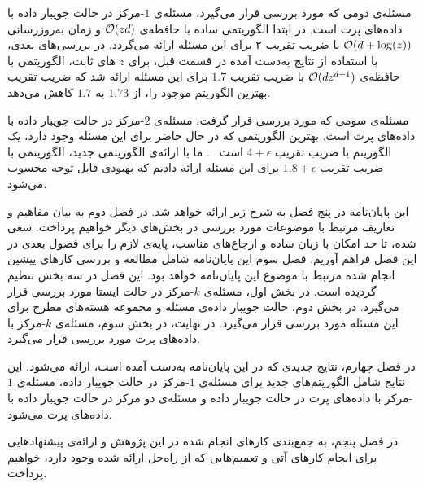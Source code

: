 مسئله‌ی دومی که مورد بررسی قرار می‌گیرد، مسئله‌ی $1$-مرکز در حالت جویبار داده با داده‌های پرت است.
در ابتدا الگوریتمی ساده با حافظه‌ی $\mathcal{O}(zd)$ و زمان به‌روزرسانی $\mathcal{O}(d + \log(z))$ با ضریب تقریب ۲ برای این مسئله ارائه می‌گردد.
در بررسی‌های بعدی، با استفاده از نتایج به‌دست آمده در قسمت قبل، برای $z$ های ثابت، الگوریتمی با حافظه‌ی $\mathcal{O}(dz^{d+1})$ با ضریب تقریب $1.7$ برای این مسئله ارائه شد که ضریب تقریب بهترین الگوریتم موجود را، از $1.73$ به $1.7$ کاهش می‌دهد.

مسئله‌ی سومی که مورد بررسی قرار گرفت، مسئله‌ی $2$-مرکز در حالت جویبار داده با داده‌های پرت است.
بهترین الگوریتمی که در حال حاضر برای این مسئله وجود دارد، یک الگوریتم با ضریب تقریب $4 + \epsilon$ است ~.
ما با ارائه‌ی الگوریتمی جدید، الگوریتمی با ضریب تقریب $1.8 + \epsilon$ برای این مسئله ارائه دادیم که بهبودی قابل توجه محسوب می‌شود.
 


این پایان‌نامه در پنج فصل به شرح زیر ارائه خواهد شد.
در فصل دوم به بیان مفاهیم و تعاریف مرتبط با موضوعات مورد بررسی در بخش‌های دیگر خواهیم پرداخت. سعی شده، تا حد امکان با زبان ساده و ارجاع‌های مناسب، پایه‌ی لازم را برای فصول بعدی در این فصل فراهم آوریم.
فصل سوم این پایان‌نامه شامل مطالعه و بررسی کارهای پیشین انجام شده مرتبط با موضوع این پایان‌نامه خواهد بود.
این فصل در سه بخش تنظیم گردیده است.
در بخش اول، مسئله‌ی $k$-مرکز در حالت ایستا مورد بررسی قرار می‌گیرد.
در بخش دوم، حالت جویبار داده‌ی مسئله و مجموعه هسته‌های مطرح برای این مسئله مورد بررسی قرار می‌گیرد. در نهایت، در بخش سوم، مسئله‌ی $k$-مرکز با داده‌های پرت مورد بررسی قرار می‌گیرد.

در فصل چهارم، نتایج جدیدی که در این پایان‌نامه به‌دست آمده است، ارائه می‌شود.
این نتایج شامل الگوریتم‌های جدید برای مسئله‌ی $1$-مرکز در حالت جویبار داده، مسئله‌ی $1$-مرکز با داده‌های پرت در حالت جویبار داده و مسئله‌ی دو مرکز در حالت جویبار داده با داده‌های پرت می‌شود.

در فصل پنجم، به جمع‌بندی کارهای انجام شده در این پژوهش و ارائه‌ی پیشنهادهایی برای انجام کارهای آتی و تعمیم‌هایی که از راه‌حل ارائه شده وجود دارد، خواهیم پرداخت.